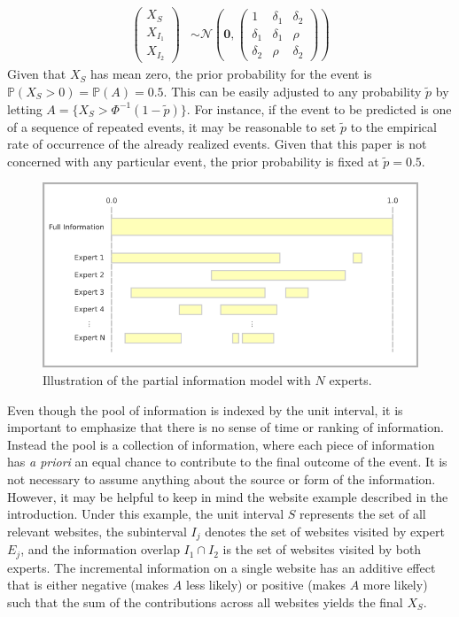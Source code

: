 \documentclass[11pt]{article}
\renewcommand{\P}{\mathbb{P}}
\theoremstyle{definition}
\theoremstyle{definition}
\begin{document}
\begin{align}
\left(\begin{matrix} X_S \\ X_{I_1}\\ X_{I_2} \end{matrix}\right) &\sim \mathcal{N}\left(
 \boldsymbol{0},  \left(\begin{matrix} 
1 & \delta_1 & \delta_2\\
\delta_1 & \delta_1 &\rho\\
\delta_2 & \rho & \delta_2
 \end{matrix}\right)\right) \label{twoExperts}
\end{align}
Given that $X_S$ has mean zero, the prior probability for the event is $\P(X_S > 0) = \P(A) = 0.5$. This can be easily adjusted to any probability $\tilde{p}$ by letting $A = \{ X_S > \Phi^{-1}(1-\tilde{p}) \}$. For instance, if the event to be predicted is one of a sequence of repeated events,  it may be reasonable to set $\tilde{p}$ to the empirical rate of occurrence of the already realized events. Given that this paper is not concerned with any particular event, the prior probability is  fixed at $\tilde{p} = 0.5$.  

\begin{figure}[htbp]
   \includegraphics[width = \textwidth]{N=N} %
   \caption{Illustration of the partial information model with $N$ experts.}
   \label{diagramN}
\end{figure}


 Even though the pool of information is indexed by the unit interval, it is important to emphasize that there is no sense of time or ranking of information. Instead the pool is a collection of information, where each piece of information has \textit{a priori} an equal chance to contribute to the final outcome of the event. It is not necessary to assume anything about the source or form of the information. However, it may be helpful to keep in mind the website example described in the introduction. Under this example, the unit interval $S$ represents the set of all relevant websites, the subinterval $I_j$ denotes the set of websites visited by expert $E_j$, and the information overlap $I_1 \cap I_2$ is the set of websites visited by both experts. The incremental information on a single website has an additive effect that is either negative (makes $A$ less likely) or positive (makes $A$ more likely) such that the sum of the contributions across all websites yields the final $X_S$. 
\end{document}
